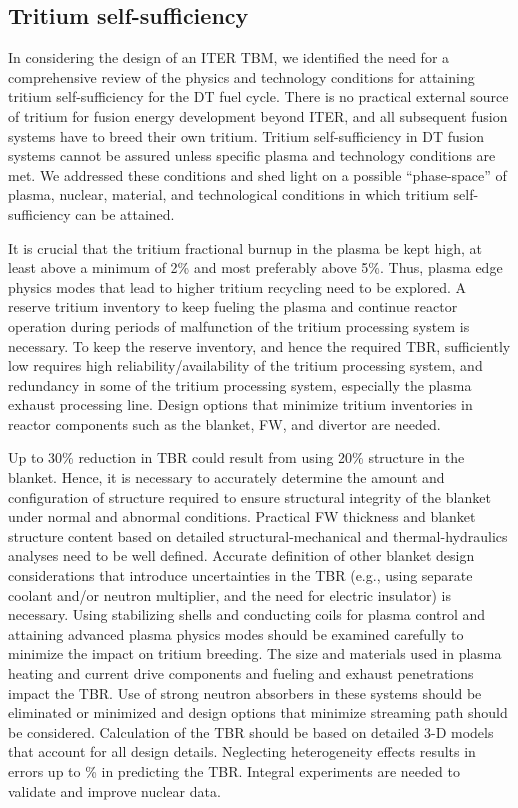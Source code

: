 \subsection{Tritium self-sufficiency}

In considering the design of an ITER \gls{TBM}, we identified the need for a
comprehensive review of the physics and technology conditions for attaining
tritium self-sufficiency for the DT fuel cycle.  There is no practical
external source of tritium for fusion energy development beyond ITER, and all
subsequent fusion systems have to breed their own tritium. Tritium
self-sufficiency in DT fusion systems cannot be assured unless specific plasma
and technology conditions are met. We addressed these conditions and shed
light on a possible “phase-space” of plasma, nuclear, material, and
technological conditions in which tritium self-sufficiency can be attained.

It is crucial that the tritium fractional burnup in the plasma be kept high,
at least above a minimum of 2\% and most preferably above 5\%. Thus, plasma
edge physics modes that lead to higher tritium recycling need to be
explored. A reserve tritium inventory to keep fueling the plasma and continue
reactor operation during periods of malfunction of the tritium processing
system is necessary. To keep the reserve inventory, and hence the required
\gls{TBR}, sufficiently low requires high reliability/availability of the
tritium processing system, and redundancy in some of the tritium processing
system, especially the plasma exhaust processing line. Design options that
minimize tritium inventories in reactor components such as the blanket, FW,
and divertor are needed.

Up to 30\% reduction in \gls{TBR} could result from using 20\% structure in
the blanket. Hence, it is necessary to accurately determine the amount and
configuration of structure required to ensure structural integrity of the
blanket under normal and abnormal conditions. Practical FW thickness and
blanket structure content based on detailed structural-mechanical and
thermal-hydraulics analyses need to be well defined. Accurate definition of
other blanket design considerations that introduce uncertainties in the
\gls{TBR} (e.g., using separate coolant and/or neutron multiplier, and the
need for electric insulator) is necessary. Using stabilizing shells and
conducting coils for plasma control and attaining advanced plasma physics
modes should be examined carefully to minimize the impact on tritium
breeding. The size and materials used in plasma heating and current drive
components and fueling and exhaust penetrations impact the \gls{TBR}. Use of
strong neutron absorbers in these systems should be eliminated or minimized
and design options that minimize streaming path should be
considered. Calculation of the \gls{TBR} should be based on detailed 3-D
models that account for all design details. Neglecting heterogeneity effects
results in errors up to \% in predicting the \gls{TBR}.
Integral experiments are needed to validate and improve nuclear data.


